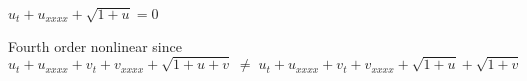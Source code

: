 $u_t + u_{xxxx} + \sqrt{1+u} = 0$

\soln* Fourth order nonlinear since
$$u_t + u_{xxxx} + v_t + v_{xxxx} + \sqrt{1+u+v} \;\neq\; u_t + u_{xxxx} + v_t + v_{xxxx} + \sqrt{1+u} + \sqrt{1+v} $$